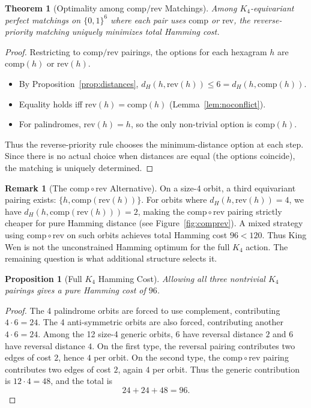 \documentclass[11pt]{article}
\theoremstyle{definition}
\newtheorem{remark}[definition]{Remark}
\theoremstyle{plain}
\newtheorem{theorem}[definition]{Theorem}
\newtheorem{proposition}[definition]{Proposition}
\newcommand{\B}{\{0,1\}}
\newcommand{\Ham}{d_H}
\newcommand{\comp}{\mathrm{comp}}
\newcommand{\rev}{\mathrm{rev}}
\begin{document}
\begin{theorem}[Optimality among $\comp/\rev$ Matchings]\label{thm:optimal}
Among $K_4$-equivariant perfect matchings on $\B^6$ where each pair uses $\comp$ or $\rev$, the reverse-priority matching uniquely minimizes total Hamming cost.
\end{theorem}

\begin{proof}
Restricting to $\comp/\rev$ pairings, the options for each hexagram $h$ are $\comp(h)$ or $\rev(h)$.
\begin{itemize}
    \item By Proposition~\ref{prop:distances}, $\Ham(h, \rev(h)) \leq 6 = \Ham(h, \comp(h))$.
    \item Equality holds iff $\rev(h) = \comp(h)$ (Lemma~\ref{lem:noconflict}).
    \item For palindromes, $\rev(h) = h$, so the only non-trivial option is $\comp(h)$.
\end{itemize}
Thus the reverse-priority rule chooses the minimum-distance option at each step. Since there is no actual choice when distances are equal (the options coincide), the matching is uniquely determined.
\end{proof}

\begin{remark}[The $\comp \circ \rev$ Alternative]\label{rem:cr}
On a size-4 orbit, a third equivariant pairing exists: $\{h, \comp(\rev(h))\}$. For orbits where $\Ham(h, \rev(h)) = 4$, we have $\Ham(h, \comp(\rev(h))) = 2$, making the $\comp \circ \rev$ pairing strictly cheaper for pure Hamming distance (see Figure~\ref{fig:comprev}). A mixed strategy using $\comp \circ \rev$ on such orbits achieves total Hamming cost $96 < 120$. Thus King Wen is not the unconstrained Hamming optimum for the full $K_4$ action. The remaining question is what additional structure selects it.
\end{remark}

\begin{proposition}[Full $K_4$ Hamming Cost]\label{prop:k4hamming96}
Allowing all three nontrivial $K_4$ pairings gives a pure Hamming cost of $96$.
\end{proposition}

\begin{proof}
The 4 palindrome orbits are forced to use complement, contributing $4\cdot 6=24$. The 4 anti-symmetric orbits are also forced, contributing another $4\cdot 6=24$. Among the 12 size-4 generic orbits, 6 have reversal distance $2$ and 6 have reversal distance $4$. On the first type, the reversal pairing contributes two edges of cost $2$, hence $4$ per orbit. On the second type, the $\comp\circ\rev$ pairing contributes two edges of cost $2$, again $4$ per orbit. Thus the generic contribution is $12\cdot 4=48$, and the total is
\[
24+24+48=96.
\]
\end{proof}
\end{document}
